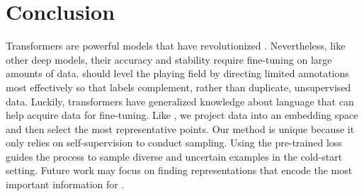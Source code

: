 \section{Conclusion}

Transformers are powerful models that have revolutionized .
Nevertheless,
like other deep models, their accuracy and stability require fine-tuning on
large amounts of data.
\al{} should level the playing field by directing
limited annotations most effectively so that labels complement, rather than
duplicate, unsupervised data.  Luckily, transformers have generalized knowledge
about language that can help acquire data for fine-tuning.  Like \badge{}, we project
data into an embedding space and then select the most
representative points. Our method is unique because it
only relies on self-supervision to conduct sampling.
Using the pre-trained loss guides the \al{} process to sample diverse and
uncertain examples in the cold-start setting.
  Future work may focus on finding representations that encode the most
  important information for \al{}.

